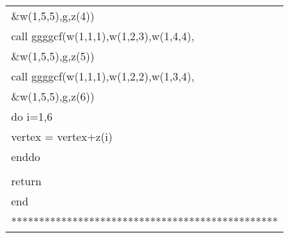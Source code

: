 \begin{center}
{\begin{supertabular}{l}
      \&\hspace{6.6em}w(1,5,5),g,z(4))\\
      \hspace{0.5em} call ggggcf(w(1,1,1),w(1,2,3),w(1,4,4),\\
      \&\hspace{6.6em}w(1,5,5),g,z(5))  \\
      \hspace{0.5em} call ggggcf(w(1,1,1),w(1,2,2),w(1,3,4),\\
      \&\hspace{6.6em}w(1,5,5),g,z(6))    \\
      \hspace{0.5em} do i=1,6\\
      \hspace{1em}    vertex = vertex+z(i)\\
      \hspace{0.5em} enddo   \\
       \\
      \hspace{0.5em} return \\
      \hspace{0.5em} end\\
************************************************\\
\end{supertabular}
}


\end{center}
